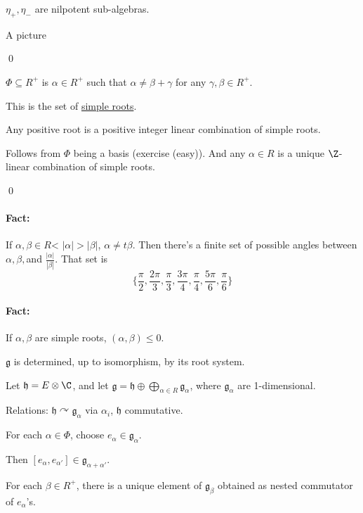 \documentclass[x11names,reqno,14pt]{extarticle}
\newcommand{\mk}[1]{\mathfrak{#1}}
\newcommand{\g}{\mk{g}}
\newcommand{\h}{\mk{h}}
\begin{document}
\exm

$\eta_+,\eta_-$ are nilpotent sub-algebras.

\proof

A picture

\qed


$\Phi \subseteq R^+$ is $\alpha \in R^+$ such that $\alpha \neq \beta + \gamma$ for any $\gamma,\beta \in R^+$. 

This is the set of \underline{simple roots}. 

\prop

Any positive root is a positive integer linear combination of simple roots. 

\proof

Follows from $\Phi$ being a basis (exercise (easy)). And any $\alpha \in R$ is a unique $\Z$-linear combination of simple roots. 

\qed

\paragraph{Fact:} If $\alpha,\beta\in R$< $|\alpha|>|\beta|$, $\alpha \neq t\beta$. Then there's a finite set of possible angles between $\alpha,\beta, $and $\frac{|\alpha|}{|\beta|}$. That set is
\[
\{\frac{\pi}{2},\frac{2\pi}{3},\frac{\pi}{3},\frac{3\pi}{4},\frac{\pi}{4},\frac{5\pi}{6},\frac{\pi}{6}\}
\]

\paragraph{Fact:} If $\alpha,\beta$ are simple roots, $(\alpha,\beta)\leq0$. 

\cor

$\g$ is determined, up to isomorphism, by its root system. 

\proof

Let $\h = E\otimes\C$, and let $\g = \h \oplus \bigoplus_{\alpha\in R}\g_\alpha$, where $\g_\alpha$ are 1-dimensional. 

Relations: $\h\curvearrowright \g_\alpha$ via $\alpha_i$, $\h$ commutative. 

For each $\alpha \in \Phi$, choose $e_\alpha \in \g_\alpha$. 

Then $[e_\alpha,e_{\alpha'}] \in \g_{\alpha+\alpha'}$. 

For each $\beta \in R^+$, there is a unique element of $\g_\beta$ obtained as nested commutator of $e_\alpha$'s. 
\end{document}
